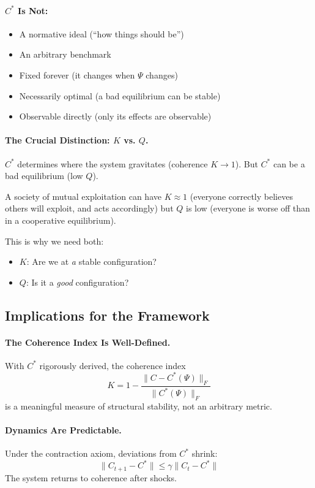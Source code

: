 \documentclass[12pt,a4paper]{article}
\begin{document}
\paragraph{$C^*$ Is Not:}
\begin{itemize}
  \item A normative ideal (``how things should be'')
  \item An arbitrary benchmark
  \item Fixed forever (it changes when $\Psi$ changes)
  \item Necessarily optimal (a bad equilibrium can be stable)
  \item Observable directly (only its effects are observable)
\end{itemize}

\paragraph{The Crucial Distinction: $K$ vs. $Q$.}
$C^*$ determines where the system gravitates (coherence $K \to 1$).
But $C^*$ can be a bad equilibrium (low $Q$).

A society of mutual exploitation can have $K \approx 1$
(everyone correctly believes others will exploit, and acts accordingly)
but $Q$ is low (everyone is worse off than in a cooperative equilibrium).

This is why we need both:
\begin{itemize}
  \item $K$: Are we at \emph{a} stable configuration?
  \item $Q$: Is it a \emph{good} configuration?
\end{itemize}

\subsection{Implications for the Framework}

\paragraph{The Coherence Index Is Well-Defined.}
With $C^*$ rigorously derived, the coherence index
\begin{equation}
  K = 1 - \frac{\|C - C^*(\Psi)\|_F}{\|C^*(\Psi)\|_F}
\end{equation}
is a meaningful measure of structural stability, not an arbitrary metric.

\paragraph{Dynamics Are Predictable.}
Under the contraction axiom, deviations from $C^*$ shrink:
\begin{equation}
  \|C_{t+1} - C^*\| \leq \gamma \|C_t - C^*\|
\end{equation}
The system returns to coherence after shocks.
\end{document}
